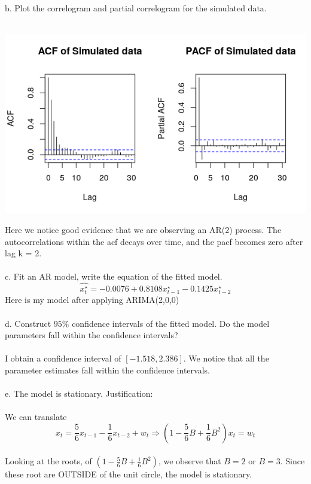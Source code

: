 \documentclass[11pt]{article}
\begin{document}
\newpage
\section{}
b. Plot the correlogram and partial correlogram for the simulated data.
\\\\
\begin{center}
\includegraphics[scale=1]{2b}
\end{center}
Here we notice good evidence that we are observing an AR(2) process. The autocorrelations within the acf decays over time, and the pacf becomes zero after lag k = 2.
\\\\
c. Fit an AR model, write the equation of the fitted model.
$$ \hat{x_t^\star} = -0.0076 + 0.8108x_{t-1}^\star - 0.1425x_{t-2}^\star $$
Here is my model after applying ARIMA(2,0,0)
\\\\
d. Construct $95\%$ confidence intervals of the fitted model. Do the model parameters fall within the confidence intervals?
\\\\
I obtain a confidence interval of $[-1.518, 2.386]$. We notice that all the parameter estimates fall within the confidence intervals.
\\\\
e. The model is stationary. Justification:
\\\\
We can translate
$$ x_t = \frac{5}{6}x_{t-1} - \frac{1}{6}x_{t-2} + w_t \Rightarrow (1-\frac{5}{6}B + \frac{1}{6}B^2)x_t = w_t $$
\\
Looking at the roots, of $ (1 - \frac{5}{6}B + \frac{1}{6}B^2)$, we observe that $B = 2$ or $B = 3$. Since these root are OUTSIDE of the unit circle, the model is stationary.
\end{document}
